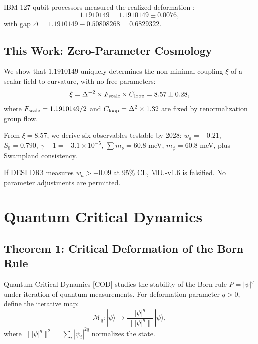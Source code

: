 \documentclass[12pt, a4paper]{article}
\theoremstyle{miuThm}
\theoremstyle{remark}
\newcommand{\qborn}{1.1910149}
\newcommand{\qcrit}{0.50808268}
\begin{document}
IBM 127-qubit processors measured the realized deformation \cite{IBM2025}:
\begin{equation}
\qborn = 1.1910149 \pm 0.0076, \label{eq:qborn}
\end{equation}
with gap $\Delta = \qborn - \qcrit = 0.6829322$. 

\subsection{This Work: Zero-Parameter Cosmology}

We show that $\qborn$ uniquely determines the non-minimal coupling $\xi$ of a 
scalar field to curvature, with no free parameters:
\begin{equation}
\xi = \Delta^{-2} \times F_{\rm scale} \times C_{\rm loop} = 8.57 \pm 0.28,
\label{eq:xi_derivation}
\end{equation}
where $F_{\rm scale} = \qborn/2$ and $C_{\rm loop} = \Delta^2 \times 1.32$ are 
fixed by renormalization group flow.

From $\xi = 8.57$, we derive six observables testable by 2028: $w_a = -0.21$, 
$S_8 = 0.790$, $\gamma-1 = -3.1 \times 10^{-5}$, $\sum m_\nu = 60.8$ meV, 
$m_\phi = 60.8$ meV, plus Swampland consistency. 

If DESI DR3 measures $w_a > -0.09$ at 95\% CL, MIU-v1.6 is falsified. 
No parameter adjustments are permitted.

\section{Quantum Critical Dynamics}
\label{sec:COD}

\subsection{Theorem 1: Critical Deformation of the Born Rule}
\label{subsec:theorem1}

Quantum Critical Dynamics [COD] studies the stability of the Born rule 
$P = |\psi|^{q}$ under iteration of quantum measurements. For deformation 
parameter $q > 0$, define the iterative map:
\begin{equation}
\mathcal{M}_q: |\psi\rangle \rightarrow \frac{|\psi|^q}{\| |\psi|^q \|} \, |\psi\rangle,
\label{eq:map}
\end{equation}
where $\| |\psi|^q \|^2 = \sum_i |\psi_i|^{2q}$ normalizes the state.
\end{document}
